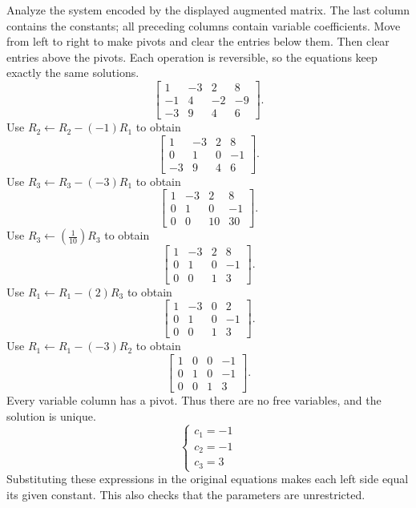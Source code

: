 \goal Analyze the system encoded by the displayed augmented matrix. The last column contains the constants; all preceding columns contain variable coefficients.
\idea Move from left to right to make pivots and clear the entries below them. Then clear entries above the pivots. Each operation is reversible, so the equations keep exactly the same solutions.
\[ \left[\begin{array}{rrr|r}1&-3&2&8\\-1&4&-2&-9\\-3&9&4&6\end{array}\right].\]
Use $R_{2}\leftarrow R_{2}-(-1)R_{1}$ to obtain
\[ \left[\begin{array}{rrr|r}1&-3&2&8\\0&1&0&-1\\-3&9&4&6\end{array}\right].\]
Use $R_{3}\leftarrow R_{3}-(-3)R_{1}$ to obtain
\[ \left[\begin{array}{rrr|r}1&-3&2&8\\0&1&0&-1\\0&0&10&30\end{array}\right].\]
Use $R_{3}\leftarrow(\frac{1}{10})R_{3}$ to obtain
\[ \left[\begin{array}{rrr|r}1&-3&2&8\\0&1&0&-1\\0&0&1&3\end{array}\right].\]
Use $R_{1}\leftarrow R_{1}-(2)R_{3}$ to obtain
\[ \left[\begin{array}{rrr|r}1&-3&0&2\\0&1&0&-1\\0&0&1&3\end{array}\right].\]
Use $R_{1}\leftarrow R_{1}-(-3)R_{2}$ to obtain
\[ \left[\begin{array}{rrr|r}1&0&0&-1\\0&1&0&-1\\0&0&1&3\end{array}\right].\]
Every variable column has a pivot. Thus there are no free variables, and the solution is unique.
\[ \begin{cases}c_{1}=-1\\c_{2}=-1\\c_{3}=3\end{cases}\]
Substituting these expressions in the original equations makes each left side equal its given constant. This also checks that the parameters are unrestricted.

